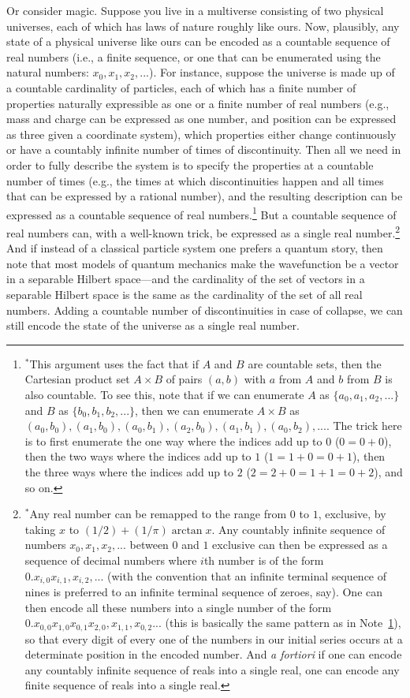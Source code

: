 Or consider magic. Suppose you live in a multiverse consisting of two physical universes, each of which has laws of nature roughly like 
ours. Now, plausibly, any state of a physical universe like ours can be encoded as a countable sequence of real numbers (i.e., a finite
sequence, or one that can be enumerated using the natural numbers: $x_0,x_1,x_2,...$). For instance, suppose the universe is made up of 
a countable cardinality of particles, each of which has a finite number of properties naturally expressible as one or a finite number of real 
numbers (e.g., mass and charge can be expressed as one number, and position can be expressed as three given a coordinate system), which
properties either change continuously or have a countably infinite number of times of discontinuity. Then all we need in order to fully
describe the system is to specify the properties at a countable number of times (e.g., the times at which discontinuities happen and
all times that can be expressed by a rational number), and the resulting description can be expressed as a countable sequence of real 
numbers.\footnote{\label{note:product}$^*$This argument uses the fact that if $A$ and $B$ are countable sets, then the Cartesian product set $A\times B$ of pairs $(a,b)$ with
$a$ from $A$ and $b$ from $B$ is also countable. To see this, note that if we can enumerate $A$ as $\{ a_0,a_1,a_2,... \}$ and
$B$ as $\{ b_0,b_1,b_2,... \}$, then we can enumerate $A\times B$ as $(a_0,b_0), (a_1,b_0), (a_0,b_1), (a_2,b_0), (a_1,b_1), (a_0,b_2),...$.
The trick here is to first enumerate the one way where the indices add up to $0$ ($0=0+0$), then the two ways where the indices add up to
$1$ ($1=1+0=0+1$), then the three ways where the indices add up to $2$ ($2=2+0=1+1=0+2$), and so on.} But a countable sequence of real
numbers can, with a well-known trick, be expressed as a single real number.\footnote{$^*$Any real number can be remapped to the range
from $0$ to $1$, exclusive, by taking $x$ to $(1/2)+(1/\pi)\arctan x$. Any countably infinite sequence of numbers $x_0,x_1,x_2,...$ between $0$ and $1$ 
exclusive can then be expressed as a sequence of decimal numbers where $i$th number is of the form $0.x_{i,0}x_{i,1},x_{i,2},...$ (with 
the convention that an infinite terminal sequence of nines is preferred to an infinite terminal sequence of zeroes, say). One can then 
encode all these numbers into a single number of the form 
$0.x_{0,0}x_{1,0}x_{0,1}x_{2,0},x_{1,1},x_{0,2}...$ (this is basically the same pattern as in Note~\ref{note:product}), so that every
digit of every one of the numbers in our initial series occurs at a determinate position in the encoded number. And \textit{a fortiori}
if one can encode any countably infinite sequence of reals into a single real, one can encode any finite sequence of reals into a single
real.} And if instead of a classical particle system one prefers a quantum story, then note that most models of quantum mechanics make 
the wavefunction be a vector in a separable Hilbert space---and the cardinality of the set of vectors in a separable Hilbert space is the 
same as the cardinality of the set of all real numbers. Adding a countable number of discontinuities in case of collapse, we can still
encode the state of the universe as a single real number.

